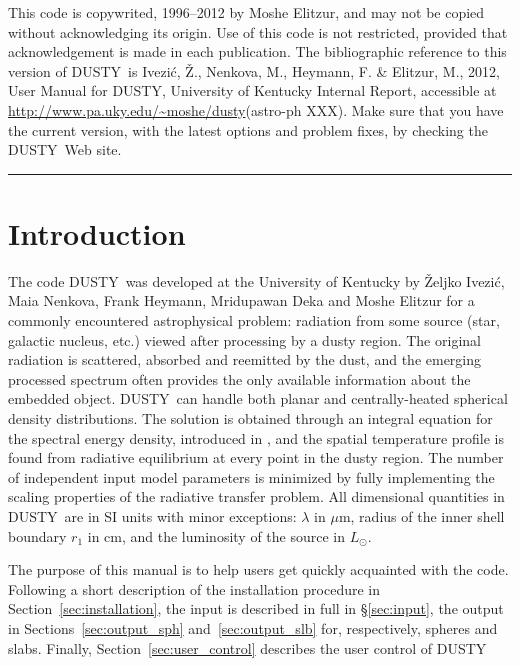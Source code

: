 \documentclass[11pt]{article}
\def\D    {{\sf DUSTY}}
\def\mic    {\hbox{$\mu$m}}
\def\Lo     {\hbox{$L_{\odot}$}}
\def\Ivezic {Ivezi\'c}
\begin{document}
\newpage

\thispagestyle{empty}

This code is copywrited, 1996--2012 by Moshe Elitzur, and may not be
copied without acknowledging its origin. Use of this code is not
restricted, provided that acknowledgement is made in each publication.
The bibliographic reference to this version of \D\ is \Ivezic, \v Z.,
Nenkova, M., Heymann, F. \& Elitzur, M., 2012, User Manual for \D,
University of Kentucky Internal Report, accessible at
\url{http://www.pa.uky.edu/~moshe/dusty}(astro-ph XXX). Make sure that
you have the current version, with the latest options and problem
fixes, by checking the \D\ Web site.

\newpage

 \setcounter{page}{1}

{\large\tableofcontents}

\bigskip \bigskip \hrule \bigskip \bigskip


\section{Introduction}
\label{sec:Introduction}

The code \D\ was developed at the University of Kentucky by \v Zeljko
\Ivezic, Maia Nenkova, Frank Heymann, Mridupawan Deka and Moshe
Elitzur for a commonly encountered astrophysical problem: radiation
from some source (star, galactic nucleus, etc.) viewed after
processing by a dusty region. The original radiation is scattered,
absorbed and reemitted by the dust, and the emerging processed
spectrum often provides the only available information about the
embedded object. \D\ can handle both planar and centrally-heated
spherical density distributions.  The solution is obtained through an
integral equation for the spectral energy density, introduced in
\cite{IE97}, and the spatial temperature profile is found from
radiative equilibrium at every point in the dusty region. The number
of independent input model parameters is minimized by fully
implementing the scaling properties of the radiative transfer problem.
All dimensional quantities in \D\ are in SI units with minor
exceptions: $\lambda$ in \mic, radius of the inner shell boundary
$r_1$ in cm, and the luminosity of the source in \Lo.

The purpose of this manual is to help users get quickly acquainted with the
code. Following a short description of the installation procedure in
Section~\ref{sec:installation}, the input is described in full in
\S\ref{sec:input}, the output in Sections~\ref{sec:output_sph}
and~\ref{sec:output_slb} for, respectively, spheres and slabs. Finally,
Section~\ref{sec:user_control} describes the user control of \D
\end{document}
